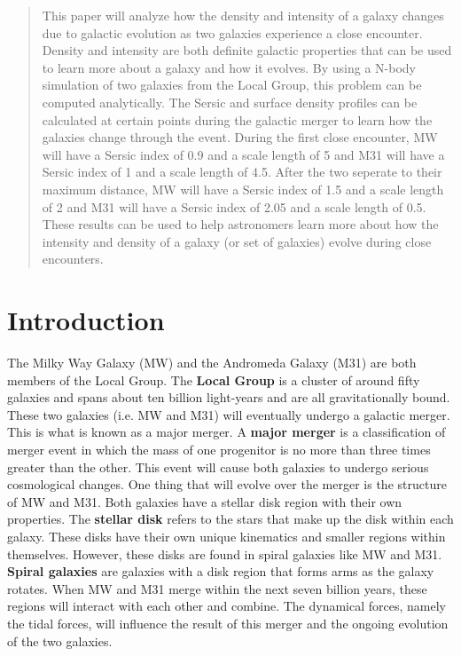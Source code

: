 \documentclass[linenumbers,trackchanges,twocolumn]{aastex7}
\begin{document}
\begin{abstract}
    This paper will analyze how the density and intensity of a galaxy
    changes due to galactic evolution as two galaxies experience a close
    encounter. Density and intensity are both definite galactic properties
    that can be used to learn more about a galaxy and how it evolves. By
    using a N-body simulation of two galaxies from the Local Group, this
    problem can be computed analytically. The Sersic and surface
    density profiles can be calculated at certain points during the
    galactic merger to learn how the galaxies change through the event.
    During the first close encounter, MW will have a Sersic index of 0.9
    and a scale length of 5 and M31 will have a Sersic index of 1 and a
    scale length of 4.5. After the two seperate to their maximum distance,
    MW will have a Sersic index of 1.5 and a scale length of 2 and M31
    will have a Sersic index of 2.05 and a scale length of 0.5.
    These results can be used to help astronomers learn more about how the
    intensity and density of a galaxy (or set of galaxies) evolve during
    close encounters.
\end{abstract}


\section{Introduction}

The Milky Way Galaxy (MW) and the Andromeda Galaxy (M31) are both
members of the Local Group. The \textbf{Local Group} is a cluster of
around fifty galaxies and spans about ten billion light-years and are all
gravitationally bound. These
two galaxies (i.e. MW and M31) will eventually undergo a galactic
merger. This is what is known as a major merger. A \textbf{major merger}
is a classification of merger event in which the mass of one progenitor is
no more than three times greater than the other.
This event will cause both galaxies to undergo serious 
cosmological changes. One thing that will evolve over the merger
is the structure of MW and M31. Both galaxies have a stellar disk region
with their own properties. The \textbf{stellar
disk} refers to the stars that make up the
disk  within each galaxy. These disks have their own unique kinematics and
smaller regions within themselves. However, these disks are found in
spiral galaxies like MW and M31. \textbf{Spiral galaxies} are galaxies
with a disk region that forms arms as the galaxy rotates. When MW and
M31 merge within the next seven billion years, these regions will
interact with each other and combine. The dynamical forces, namely the
tidal forces, will influence the result of this merger and the ongoing
evolution of the two galaxies.
\end{document}

